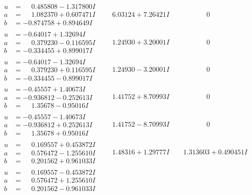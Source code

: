 \documentclass[1p]{elsarticle_modified}
\theoremstyle{definition}
\begin{document}
$$\begin{array}{c|c|c}
\begin{aligned}
u &= \phantom{-}0.485808 - 1.317800 I \\
a &= \phantom{-}1.082370 + 0.607471 I \\
b &= -0.874758 + 0.894649 I\end{aligned}
 & \phantom{-}6.03124 + 7.26421 I & \phantom{-0.000000 } 0 \\ \hline\begin{aligned}
u &= -0.64017 + 1.32694 I \\
a &= \phantom{-}0.379230 - 0.116595 I \\
b &= -0.334455 + 0.899017 I\end{aligned}
 & \phantom{-}1.24930 + 3.20001 I & \phantom{-0.000000 } 0 \\ \hline\begin{aligned}
u &= -0.64017 - 1.32694 I \\
a &= \phantom{-}0.379230 + 0.116595 I \\
b &= -0.334455 - 0.899017 I\end{aligned}
 & \phantom{-}1.24930 - 3.20001 I & \phantom{-0.000000 } 0 \\ \hline\begin{aligned}
u &= -0.45557 + 1.40673 I \\
a &= -0.936812 - 0.252613 I \\
b &= \phantom{-}1.35678 - 0.95016 I\end{aligned}
 & \phantom{-}1.41752 + 8.70993 I & \phantom{-0.000000 } 0 \\ \hline\begin{aligned}
u &= -0.45557 - 1.40673 I \\
a &= -0.936812 + 0.252613 I \\
b &= \phantom{-}1.35678 + 0.95016 I\end{aligned}
 & \phantom{-}1.41752 - 8.70993 I & \phantom{-0.000000 } 0 \\ \hline\begin{aligned}
u &= \phantom{-}0.169557 + 0.453872 I \\
a &= \phantom{-}0.576472 - 1.255610 I \\
b &= \phantom{-}0.201562 + 0.961033 I\end{aligned}
 & \phantom{-}1.48316 + 1.29777 I & \phantom{-}1.313603 + 0.490451 I \\ \hline\begin{aligned}
u &= \phantom{-}0.169557 - 0.453872 I \\
a &= \phantom{-}0.576472 + 1.255610 I \\
b &= \phantom{-}0.201562 - 0.961033 I\end{aligned}

\end{array}$$
\end{document}
